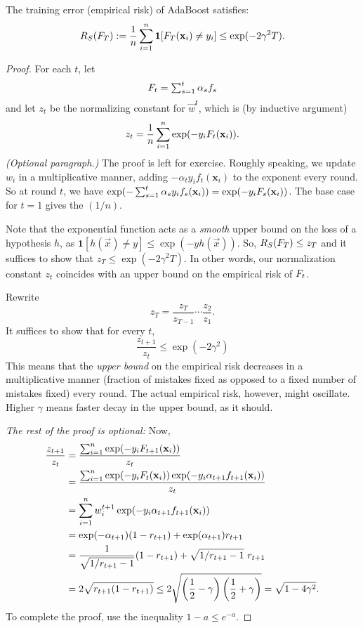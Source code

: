 \documentclass{discussion}
\begin{document}
\begin{theorem}
  The training error (empirical risk) of AdaBoost satisfies:
  \[R_S(F_T) := \frac{1}{n} \sum_{i=1}^{n} \mathbf{1}[F_T(\mathbf{x}_i) \neq y_i] \leq \exp(-2 \gamma^2 T).\]
\end{theorem}
\begin{proof} For each $t$, let
\[\textstyle F_t = \sum_{s=1}^{t} \alpha_s f_s\]
and let $z_t$ be the normalizing constant for $\vec{w}^t$, which is (by inductive argument)
\[z_t = \frac{1}{n}\sum_{i=1}^{n} \exp(-y_i F_t (\mathbf{x}_i)).\]
\emph{(Optional paragraph.)} The proof is left for exercise. Roughly speaking, we update $w_i$ in a multiplicative manner, adding $-\alpha_t y_i f_t(\mathbf{x}_i)$ to the exponent every round. So at round $t$, we have $\exp(-\sum_{s=1}^{t} \alpha_s y_i f_s(\mathbf{x}_i)) = \exp(-y_i F_s(\mathbf{x}_i))$. The base case for $t=1$ gives the $(1/n)$.


Note that the exponential function acts as a \emph{smooth} upper bound on the loss of a hypothesis $h$, as $\mathbf{1}[h(\vec{x}) \neq y] \leq \exp(-y h(\vec{x})).$ So,
$R_S(F_T) \leq z_T$ and it suffices to show that $z_T \leq \exp(-2\gamma^2 T)$. In other words, our normalization constant $z_t$ coincides with an upper bound on the empirical risk of $F_t$.


Rewrite \[z_T = \frac{z_T}{z_{T-1}} \cdots \frac{z_2}{z_1}.\]
It suffices to show that for every $t$, \[\frac{z_{t+1}}{z_t} \leq \exp(-2\gamma^2)\]
This means that the \emph{upper bound} on the empirical risk decreases in a multiplicative manner (fraction of mistakes fixed as opposed to a fixed number of mistakes fixed) every round. The actual empirical risk, however, might oscillate. Higher $\gamma$ means faster decay in the upper bound, as it should.

\emph{The rest of the proof is optional:} Now,
\begin{align*}
  \frac{z_{t+1}}{z_t} &= \frac{\sum_{i=1}^{n} \exp(-y_i F_{t+1}(\mathbf{x}_i))}{z_t} \\
  &= \frac{\sum_{i=1}^{n} \exp(-y_i F_{t}(\mathbf{x}_i)) \exp(-y_i \alpha_{t+1} f_{t+1}(\mathbf{x}_i))}{z_t} \\
  &=\sum_{i=1}^{n} w_i^{t+1} \exp(-y_i \alpha_{t+1} f_{t+1}(\mathbf{x}_i)) \\
  &= \exp(-\alpha_{t+1})(1-r_{t+1}) + \exp(\alpha_{t+1})r_{t+1} \\
  &= \frac{1}{\sqrt{1/r_{t+1} - 1}}(1-r_{t+1}) + \sqrt{1/r_{t+1} - 1} \ r_{t+1} \\
  &= 2\sqrt{r_{t+1} (1-r_{t+1})} \leq 2 \sqrt{\left(\frac{1}{2} - \gamma\right) \left(\frac{1}{2} + \gamma\right)} = \sqrt{1 - 4\gamma^2}.
\end{align*}
To complete the proof, use the inequality $1 - a \leq e^{-a}$.
\end{proof}
\end{document}
